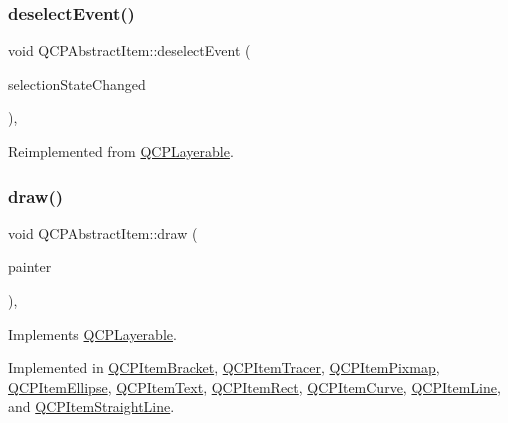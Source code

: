 \mbox{\label{class_q_c_p_abstract_item_af9093798cb07a861dcc73f93ca16c0c1}} 
\subsubsection{\texorpdfstring{deselect\+Event()}{deselectEvent()}}
{\footnotesize\ttfamily void Q\+C\+P\+Abstract\+Item\+::deselect\+Event (\begin{DoxyParamCaption}\item[{bool $\ast$}]{selection\+State\+Changed }\end{DoxyParamCaption})\hspace{0.3cm}{\ttfamily [protected]}, {\ttfamily [virtual]}}



Reimplemented from \hyperlink{class_q_c_p_layerable_ae546370644a5551c76af739afc008bee}{Q\+C\+P\+Layerable}.

\mbox{\label{class_q_c_p_abstract_item_a007fdab79c935a5da5aa04a21d268c18}} 
\subsubsection{\texorpdfstring{draw()}{draw()}}
{\footnotesize\ttfamily void Q\+C\+P\+Abstract\+Item\+::draw (\begin{DoxyParamCaption}\item[{\hyperlink{class_q_c_p_painter}{Q\+C\+P\+Painter} $\ast$}]{painter }\end{DoxyParamCaption})\hspace{0.3cm}{\ttfamily [protected]}, {}}



Implements \hyperlink{class_q_c_p_layerable_aecf2f7087482d4b6a78cb2770e5ed12d}{Q\+C\+P\+Layerable}.



Implemented in \hyperlink{class_q_c_p_item_bracket_a942a3978aea44a2fc7b4383f2bf6d417}{Q\+C\+P\+Item\+Bracket}, \hyperlink{class_q_c_p_item_tracer_a11f187ffea436434f3b5cfc387811967}{Q\+C\+P\+Item\+Tracer}, \hyperlink{class_q_c_p_item_pixmap_a9538a7d37fe20a4ff4bb2cb5bbbf2b48}{Q\+C\+P\+Item\+Pixmap}, \hyperlink{class_q_c_p_item_ellipse_a77eebd67a402fc496082a2e51356928c}{Q\+C\+P\+Item\+Ellipse}, \hyperlink{class_q_c_p_item_text_a8f8f075da83b6547c2b32e1f64cf0554}{Q\+C\+P\+Item\+Text}, \hyperlink{class_q_c_p_item_rect_a3c492960d0fc038cf1b60578b62b6cdc}{Q\+C\+P\+Item\+Rect}, \hyperlink{class_q_c_p_item_curve_a856ae61de18278847ba5e0e357bf68f2}{Q\+C\+P\+Item\+Curve}, \hyperlink{class_q_c_p_item_line_ae184140b61b2ef5b8edde76304447200}{Q\+C\+P\+Item\+Line}, and \hyperlink{class_q_c_p_item_straight_line_acbc84ad219bf4845152e4e2202fcaa3c}{Q\+C\+P\+Item\+Straight\+Line}.


